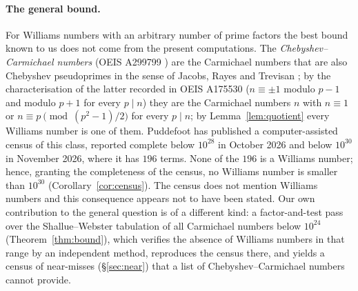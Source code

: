 \documentclass[11pt]{amsart}
\theoremstyle{definition}
\theoremstyle{remark}
\begin{document}
\paragraph{The general bound.} For Williams numbers with an arbitrary number of prime factors the best bound known to us does not come from the present computations. The \emph{Chebyshev--Carmichael numbers} (OEIS A299799 \cite{OEIS}) are the Carmichael numbers that are also Chebyshev pseudoprimes in the sense of Jacobs, Rayes and Trevisan \cite{JRT08}; by the characterisation of the latter recorded in OEIS A175530 ($n\equiv\pm1$ modulo $p-1$ and modulo $p+1$ for every $p\mid n$) they are the Carmichael numbers $n$ with $n\equiv1$ or $n\equiv p\pmod{(p^2-1)/2}$ for every $p\mid n$; by Lemma~\ref{lem:quotient} every Williams number is one of them. Puddefoot \cite{Pud28,Pud30} has published a computer-assisted census of this class, reported complete below $10^{28}$ in October 2026 and below $10^{30}$ in November 2026, where it has $196$ terms. None of the $196$ is a Williams number; hence, granting the completeness of the census, no Williams number is smaller than $10^{30}$ (Corollary~\ref{cor:census}). The census does not mention Williams numbers and this consequence appears not to have been stated. Our own contribution to the general question is of a different kind: a factor-and-test pass over the Shallue--Webster tabulation of all Carmichael numbers below $10^{24}$ (Theorem~\ref{thm:bound}), which verifies the absence of Williams numbers in that range by an independent method, reproduces the census there, and yields a census of near-misses (\S\ref{sec:near}) that a list of Chebyshev--Carmichael numbers cannot provide.
\end{document}
